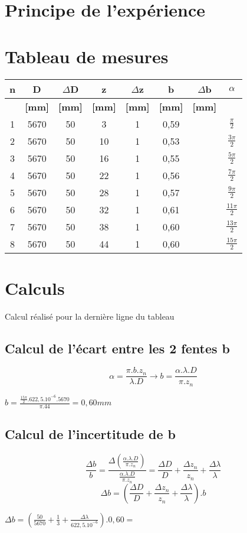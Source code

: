 \documentclass[11pt,a4paper]{report}
\begin{document}
	\section{Principe de l'expérience}
	\section{Tableau de mesures}
	\begin{tabular}{|c|c|c|c|c|c|c|c|}
		\hline
		\bf n & \bf D & \bf $\Delta$D & \bf z & \bf $\Delta$z & \bf b & \bf $\Delta$b & \bf $\alpha$ \\
		\hline
		 & \bf [mm] & \bf [mm] & \bf [mm] & \bf [mm] & \bf [mm]  & \bf [mm]  &  \\
		\hline
		1 & 5670 & 50 & 3 &   1&0,59&  & $\frac{\pi}{2}$\\
		2 & 5670 & 50 & 10 &  1&0,53&  & $\frac{3\pi}{2}$\\
		3 & 5670 & 50 & 16 &  1&0,55&  & $\frac{5\pi}{2}$\\
		4 & 5670 & 50 & 22 &  1&0,56&  & $\frac{7\pi}{2}$\\
		5 & 5670 & 50 & 28 &  1&0,57&  & $\frac{9\pi}{2}$\\
		6 & 5670 & 50 & 32 &  1&0,61&  & $\frac{11\pi}{2}$\\
		7 & 5670 & 50 & 38 &  1&0,60&  & $\frac{13\pi}{2}$\\
		8 & 5670 & 50 & 44 &  1&0,60 &  & $\frac{15\pi}{2}$\\
		\hline
	\end{tabular}
	\section{Calculs}
		Calcul réalisé pour la dernière ligne du tableau
		\subsection{Calcul de l'écart entre les 2 fentes b}
		\begin{equation}
		\alpha = \frac{\pi.b.z_{n}}{\lambda.D} \rightarrow b = \frac{\alpha .\lambda.D }{\pi.z_{n}} 
		\end{equation}
\begin{center}$ b = \frac{\frac{15\pi}{2}.622,5.10^{-6}.5670}{\pi.44} = 0,60 mm$\end{center}
		\subsection{Calcul de l'incertitude de b}
		\begin{equation}
		\frac{\Delta b}{b} = \frac{\Delta\left(\frac{\alpha .\lambda.D }{\pi.z_{n}}\right)}{\frac{\alpha .\lambda.D }{\pi.z_{n}}} 
		= \frac{\Delta D}{D}+\frac{\Delta z_{n}}{z_{n}} + \frac{\Delta \lambda}{\lambda}
		\end{equation}
		\begin{equation}
		\Delta b
		= \left(\frac{\Delta D}{D}+\frac{\Delta z_{n}}{z_{n}} + \frac{\Delta \lambda}{\lambda}\right).b
		\end{equation}
		\begin{center}
		$\Delta b = \left(\frac{50}{5670}+\frac{1}{3} + \frac{\Delta \lambda}{622,5.10^{-6}}\right).0,60 = $
		\end{center}
\end{document}
